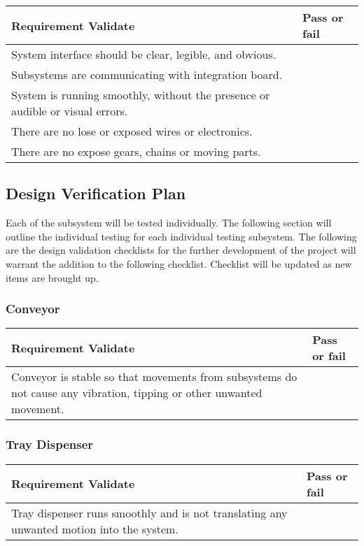 \documentclass[12pt, titlepage]{article}
\begin{document}
\begin{center}
  \begin{tabular}{ |m{10cm}|m{3cm}| } 
    \hline
    \textbf{Requirement Validate} & \textbf{Pass or fail } \\ 
    \hline
    System interface should be clear, legible, and obvious. & \\
    Subsystems are communicating with integration board.  & \\
    System is running smoothly, without the presence or audible or visual errors.& \\
    There are no lose or exposed wires or electronics.& \\
    There are no expose gears, chains or moving parts.& \\
    
    \hline
  \end{tabular}
\end{center}


\subsection{Design Verification Plan}
Each of the subsystem will be tested individually. The following section will outline the individual testing
for each individual testing subsystem. The following are the design validation checklists for the 
further development of the project will warrant the addition to the following checklist. Checklist will be updated as new items are brought up.

 \subsubsection{Conveyor}
 \begin{center}
  \begin{tabular}{ |m{10cm}|m{3cm}| } 
    \hline
    \textbf{Requirement Validate} & \textbf{Pass or fail } \\ 
    \hline
    Conveyor is stable so that movements from subsystems do not cause any vibration, tipping or other unwanted movement. & \\

    \hline
  \end{tabular}
\end{center}

\subsubsection{Tray Dispenser}
\begin{center}
 \begin{tabular}{ |m{10cm}|m{3.2cm}| } 
   \hline
   \textbf{Requirement Validate} & \textbf{Pass or fail } \\ 
   \hline
   Tray dispenser runs smoothly and is not translating any unwanted motion into the system. & \\

   \hline
 \end{tabular}
\end{center}
\end{document}

